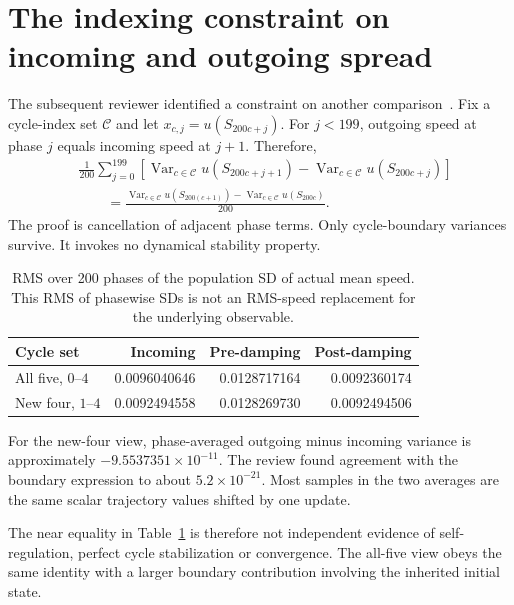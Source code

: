 \documentclass[11pt,a4paper]{article}
\DeclareMathOperator{\Var}{Var}
\begin{document}
\clearpage
\section{The indexing constraint on incoming and outgoing spread}
\label{sec:indexing}
The subsequent reviewer identified a constraint on another comparison~\cite[Sec.~5.2]{review}. Fix a cycle-index set $\mathcal C$ and let $x_{c,j}=u(S_{200c+j})$. For $j<199$, outgoing speed at phase $j$ equals incoming speed at $j+1$. Therefore,
\begin{equation}
\begin{split}
&\frac1{200}\sum_{j=0}^{199}\left[
\Var_{c\in\mathcal C}u(S_{200c+j+1})
-\Var_{c\in\mathcal C}u(S_{200c+j})\right]\\
&\qquad=\frac{\Var_{c\in\mathcal C}u(S_{200(c+1)})
-\Var_{c\in\mathcal C}u(S_{200c})}{200}.
\end{split}
\label{eq:telescoping}
\end{equation}
The proof is cancellation of adjacent phase terms. Only cycle-boundary variances survive. It invokes no dynamical stability property.

\begin{table}[ht]
\centering\small
\begin{tabular}{lrrr}
\toprule
Cycle set & Incoming & Pre-damping & Post-damping\\
\midrule
All five, $0$--$4$ & 0.0096040646 & 0.0128717164 & 0.0092360174\\
New four, $1$--$4$ & 0.0092494558 & 0.0128269730 & 0.0092494506\\
\bottomrule
\end{tabular}
\caption{\small RMS over 200 phases of the population SD of actual mean speed. This RMS of phasewise SDs is not an RMS-speed replacement for the underlying observable.}
\label{tab:spread}
\end{table}

For the new-four view, phase-averaged outgoing minus incoming variance is approximately $-9.5537351\times10^{-11}$. The review found agreement with the boundary expression to about $5.2\times10^{-21}$. Most samples in the two averages are the same scalar trajectory values shifted by one update.

The near equality in Table~\ref{tab:spread} is therefore not independent evidence of self-regulation, perfect cycle stabilization or convergence. The all-five view obeys the same identity with a larger boundary contribution involving the inherited initial state.
\end{document}
